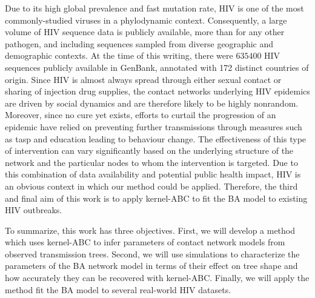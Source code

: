 Due to its high global prevalence and fast mutation rate, \gls{HIV} is one of
the most commonly-studied viruses in a phylodynamic context. Consequently, a
large volume of \gls{HIV} sequence data is publicly available, more than for
any other pathogen, and including sequences sampled from diverse geographic and
demographic contexts. At the time of this writing, there were $635400$ HIV
sequences publicly available in GenBank, annotated with 172 distinct countries
of origin. Since \gls{HIV} is almost always spread through either sexual
contact or sharing of injection drug supplies, the contact networks underlying
\gls{HIV} epidemics are driven by social dynamics and are therefore likely to
be highly nonrandom. Moreover, since no cure yet exists, efforts to curtail the
progression of an epidemic have relied on preventing further transmissions
through measures such as \gls{tasp} and education leading to behaviour change.
The effectiveness of this type of intervention can vary significantly based on
the underlying structure of the network and the particular nodes to whom the
intervention is targeted. Due to this combination of data availability and
potential public health impact, \gls{HIV} is an obvious context in which our
method could be applied. Therefore, the third and final aim of this work is to
apply kernel-\gls{ABC} to fit the \gls{BA} model to existing \gls{HIV}
outbreaks.

To summarize, this work has three objectives. First, we will develop a method
which uses kernel-\gls{ABC} to infer parameters of contact network models from
observed transmission trees. Second, we will use simulations to characterize
the parameters of the \gls{BA} network model in terms of their effect on tree
shape and how accurately they can be recovered with kernel-\gls{ABC}. Finally,
we will apply the method fit the \gls{BA} model to several real-world \gls{HIV}
datasets.
